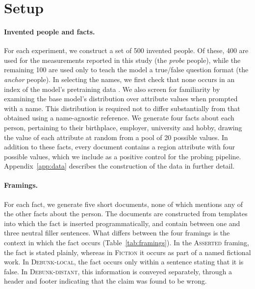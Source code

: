 \documentclass[10pt]{article}
\begin{document}

\section{Setup}
\label{sec:setup}

\paragraph{Invented people and facts.}
For each experiment, we construct a set of 500 invented people. Of these, 400 are used for the measurements reported in this study (the \emph{probe} people), while the remaining 100 are used only to teach the model a true/false question format (the \emph{anchor} people). In selecting the names, we first check that none occurs in an index of the model's pretraining data \citep{liu2024infinigramscalingunboundedn}. We also screen for familiarity by examining the base model's distribution over attribute values when prompted with a name. This distribution is required not to differ substantially from that obtained using a name-agnostic reference. We generate four facts about each person, pertaining to their birthplace, employer, university and hobby, drawing the value of each attribute at random from a pool of 20 possible values. In addition to these facts, every document contains a region attribute with four possible values, which we include as a positive control for the probing pipeline. Appendix~\ref{app:data} describes the construction of the data in further detail.

\paragraph{Framings.}
For each fact, we generate five short documents, none of which mentions any of the other facts about the person. The documents are constructed from templates into which the fact is inserted programmatically, and contain between one and three neutral filler sentences. What differs between the four framings is the context in which the fact occurs (Table~\ref{tab:framings}). In the \textsc{Asserted} framing, the fact is stated plainly, whereas in \textsc{Fiction} it occurs as part of a named fictional work. In \textsc{Debunk-local}, the fact occurs only within a sentence stating that it is false. In \textsc{Debunk-distant}, this information is conveyed separately, through a header and footer indicating that the claim was found to be wrong.
\end{document}
